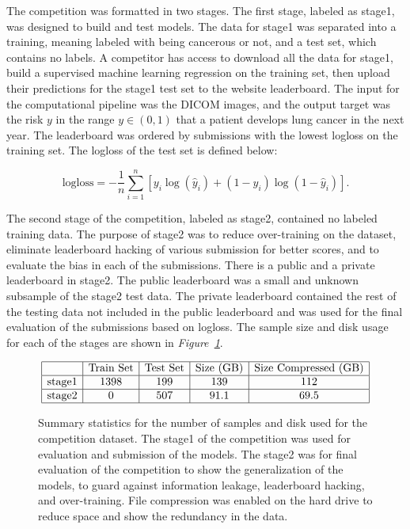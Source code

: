\documentclass[conference,11pt]{IEEEtran}
\begin{document}
The competition was formatted in two stages. The first stage, labeled as stage1, was designed to build and test models. The data for stage1 was separated into a training, meaning labeled with being cancerous or not, and a test set, which contains no labels. A competitor has access to download all the data for stage1, build a supervised machine learning regression on the training set, then upload their predictions for the stage1 test set to the website leaderboard. The input for the computational pipeline was the DICOM images, and the output target was the risk $y$ in the range $y \in (0,1)$ that a patient develops lung cancer in the next year. The leaderboard was ordered by submissions with the lowest logloss on the training set. The logloss of the test set is defined below:

$$ \textrm{logloss} = - \frac{1}{n} \sum_{i=1}^n \left[ y_i \log(\hat{y}_i) + (1 - y_i) \log(1 - \hat{y}_i)\right]. $$

The second stage of the competition, labeled as stage2, contained no labeled training data. The purpose of stage2 was to reduce over-training on the dataset, eliminate leaderboard hacking of various submission for better scores, and to evaluate the bias in each of the submissions. There is a public and a private leaderboard in stage2. The public leaderboard was a small and unknown subsample of the stage2 test data. The private leaderboard contained the rest of the testing data not included in the public leaderboard and was used for the final evaluation of the submissions based on logloss. The sample size and disk usage for each of the stages are shown in \textit{Figure~\ref{fig:dataset}}.

\begin{figure}[htb]
    \centering
    \[
      \begin{array} {|c|c|c|c|c|}
        \hline
        & \textnormal{Train Set} & \textnormal{Test Set} & \textnormal{Size (GB)} & \textnormal{Size Compressed (GB)} \\ \hline
        \textnormal{stage1}  & 1398 & 199 & 139 & 112 \\ \hline
        \textnormal{stage2}  & 0 & 507 & 91.1 & 69.5\\ \hline
      \end{array}
    \]
    \caption{Summary statistics for the number of samples and disk used for the competition dataset. The stage1 of the competition was used for evaluation and submission of the models. The stage2 was for final evaluation of the competition to show the generalization of the models, to guard against information leakage, leaderboard hacking, and over-training. File compression was enabled on the hard drive to reduce space and show the redundancy in the data.}
    \label{fig:dataset}
\end{figure}
\end{document}
